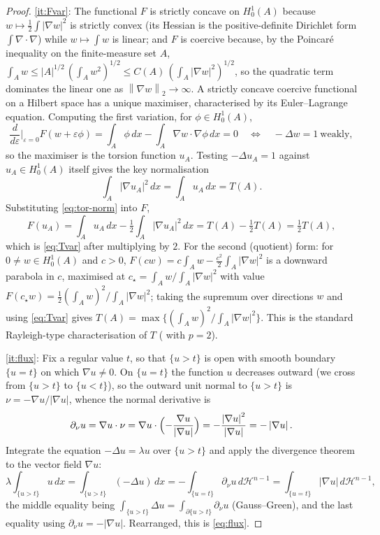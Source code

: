 \documentclass[11pt]{amsart}
\theoremstyle{definition}
\newcommand{\eps}{\varepsilon}
\newcommand{\abs}[1]{\left|#1\right|}
\newcommand{\norm}[1]{\left\|#1\right\|}
\newcommand{\dx}{\,dx}
\newcommand{\dH}{\,d\mathcal H^{n-1}}
\begin{document}
\begin{proof}
\ref{it:Fvar}: The functional $F$ is strictly concave on $H^1_0(A)$ because
$w\mapsto\tfrac12\int\abs{\nabla w}^2$ is strictly convex (its Hessian is the
positive-definite Dirichlet form $\int\nabla\cdot\nabla$) while
$w\mapsto\int w$ is linear; and $F$ is coercive because, by the Poincar\'e
inequality on the finite-measure set $A$,
$\int_A w\le\abs A^{1/2}\,(\int_A w^2)^{1/2}
\le C(A)\,(\int_A\abs{\nabla w}^2)^{1/2}$, so the quadratic term dominates
the linear one as $\norm{\nabla w}_2\to\infty$. A strictly concave coercive
functional on a Hilbert space has a unique maximiser, characterised by its
Euler--Lagrange equation. Computing the first variation, for $\phi\in
H^1_0(A)$,
\[
  \frac{d}{d\eps}\Big|_{\eps=0}F(w+\eps\phi)
  =\int_A\phi\dx-\int_A\nabla w\cdot\nabla\phi\dx=0
  \quad\Longleftrightarrow\quad -\Delta w=1\ \text{weakly},
\]
so the maximiser is the torsion function $u_A$. Testing $-\Delta u_A=1$
against $u_A\in H^1_0(A)$ itself gives the key normalisation
\begin{equation}\label{eq:tor-norm}
  \int_A\abs{\nabla u_A}^2\dx=\int_A u_A\dx=T(A).
\end{equation}
Substituting \eqref{eq:tor-norm} into $F$,
\[
  F(u_A)=\int_A u_A\dx-\tfrac12\int_A\abs{\nabla u_A}^2\dx
  =T(A)-\tfrac12 T(A)=\tfrac12 T(A),
\]
which is \eqref{eq:Tvar} after multiplying by $2$. For the second
(quotient) form: for $0\ne w\in H^1_0(A)$ and $c>0$, $F(cw)=c\int_A w
-\tfrac{c^2}{2}\int_A\abs{\nabla w}^2$ is a downward parabola in $c$,
maximised at $c_\star=\int_A w/\int_A\abs{\nabla w}^2$ with value
$F(c_\star w)=\tfrac12(\int_A w)^2/\int_A\abs{\nabla w}^2$; taking the
supremum over directions $w$ and using \eqref{eq:Tvar} gives
$T(A)=\max\{(\int_A w)^2/\int_A\abs{\nabla w}^2\}$. This is the standard
Rayleigh-type characterisation of $T$ (\cite[Prop.~2.2]{Brasco2014} with
$p=2$).

\ref{it:flux}: Fix a regular value $t$, so that $\{u>t\}$ is open with
smooth boundary $\{u=t\}$ on which $\nabla u\ne0$. On $\{u=t\}$ the function
$u$ decreases outward (we cross from $\{u>t\}$ to $\{u<t\}$), so the outward
unit normal to $\{u>t\}$ is $\nu=-\nabla u/\abs{\nabla u}$, whence the normal
derivative is
\[
  \partial_\nu u=\nabla u\cdot\nu
  =\nabla u\cdot\Bigl(-\frac{\nabla u}{\abs{\nabla u}}\Bigr)
  =-\frac{\abs{\nabla u}^2}{\abs{\nabla u}}=-\abs{\nabla u}.
\]
Integrate the equation $-\Delta u=\lambda u$ over $\{u>t\}$ and apply the
divergence theorem to the vector field $\nabla u$:
\[
  \lambda\int_{\{u>t\}}u\dx
  =\int_{\{u>t\}}(-\Delta u)\dx
  =-\int_{\{u=t\}}\partial_\nu u\dH
  =\int_{\{u=t\}}\abs{\nabla u}\dH,
\]
the middle equality being $\int_{\{u>t\}}\Delta u=\int_{\partial\{u>t\}}
\partial_\nu u$ (Gauss--Green), and the last equality using
$\partial_\nu u=-\abs{\nabla u}$. Rearranged, this is \eqref{eq:flux}.
\end{proof}
\end{document}
